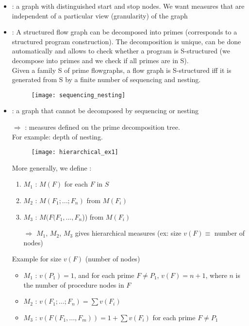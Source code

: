 \begin{itemize}
    \item {} : a graph with distinguished start and stop nodes. We want measures that are independent of a particular view (granularity) of the graph
    \item {} : A structured flow graph can be decomposed into primes (corresponds to a structured program construction). The decomposition is unique, can be done automatically and allows to check whether a program is S-structured (we decompose into primes and we check if all primes are in S).\\
    Given a family S of prime flowgraphs, a flow graph is S-structured iff it is generated from S by a finite number of sequencing and nesting.
    \begin{figure}[H]
        \centering
        \texttt{[image: sequencing\_nesting]}
    \end{figure}
    \item {}: a graph that cannot be decomposed by sequencing or nesting
    \item [$\Rightarrow$]: measures defined on the prime decomposition tree.\\
    For example: depth of nesting.
    \begin{figure}[H]
        \centering
        \texttt{[image: hierarchical\_ex1]}
    \end{figure}
    More generally, we define :
    \begin{enumerate}
        \item $M_1$ : $M(F)$ for each $F$ in $S$
        \item $M_2$ : $M(F_1;...;F_n)$ from $M(F_i)$
        \item $M_3$ : $M(F(F_1,...,F_n$)) from $M(F_i)$
        \item [$\Rightarrow$] $M_1$, $M_2$, $M_3$ gives hierarchical measures (ex: size $v(F) \equiv$ number of nodes)
    \end{enumerate}
    Example for size $v(F)$ (number of nodes)
    \begin{itemize}
        \item $M_1$ : $v(P_1) = 1$, and for each prime $F \neq P_1$, $v(F) = n+1$, where $n$ is the number of procedure nodes in $F$
        \item $M_2$ : $v(F_1; ...; F_n) = \sum v(F_i)$
        \item $M_3$ : $v(F(F_1, ..., F_m)) = 1 + \sum v(F_i)$ for each prime $F \neq P_1$
    \end{itemize}
\end{itemize}



